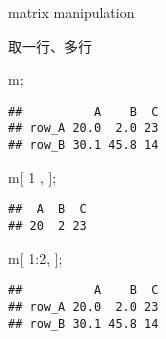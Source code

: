 \documentclass[ignorenonframetext,]{beamer}
\newenvironment{Shaded}{\begin{snugshade}}{\end{snugshade}}
\newcommand{\DecValTok}[1]{\textcolor[rgb]{0.00,0.00,0.81}{#1}}
\newcommand{\NormalTok}[1]{#1}
\newcommand{\SpecialCharTok}[1]{\textcolor[rgb]{0.00,0.00,0.00}{#1}}
\newcommand\FontSmall{\fontsize{7}{8}\selectfont}
\begin{document}
\begin{frame}[fragile]{matrix manipulation}
\protect\hypertarget{matrix-manipulation}{}
\begin{block}{取一行、多行}
\protect\hypertarget{ux53d6ux4e00ux884cux591aux884c}{}
\FontSmall

\begin{Shaded}
\begin{Highlighting}[]
\NormalTok{m;}
\end{Highlighting}
\end{Shaded}

\begin{verbatim}
##          A    B  C
## row_A 20.0  2.0 23
## row_B 30.1 45.8 14
\end{verbatim}

\begin{Shaded}
\begin{Highlighting}[]
\NormalTok{m[ }\DecValTok{1}\NormalTok{ , ];}
\end{Highlighting}
\end{Shaded}

\begin{verbatim}
##  A  B  C 
## 20  2 23
\end{verbatim}

\begin{Shaded}
\begin{Highlighting}[]
\NormalTok{m[ }\DecValTok{1}\SpecialCharTok{:}\DecValTok{2}\NormalTok{,  ];}
\end{Highlighting}
\end{Shaded}

\begin{verbatim}
##          A    B  C
## row_A 20.0  2.0 23
## row_B 30.1 45.8 14
\end{verbatim}
\end{block}
\end{frame}
\end{document}

